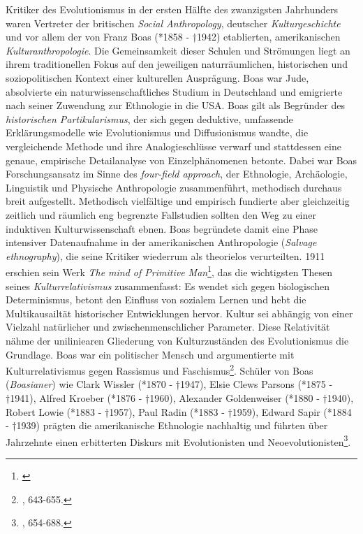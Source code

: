 \documentclass[openany,twoside,twocolumn]{book}
\let\rmarkdownfootnote\footnote%
\def\footnote{\protect\rmarkdownfootnote}
\begin{document}
Kritiker des Evolutionismus in der ersten Hälfte des zwanzigsten
Jahrhunders waren Vertreter der britischen \emph{Social Anthropology},
deutscher \emph{Kulturgeschichte} und vor allem der von Franz Boas
(*1858 - †1942) etablierten, amerikanischen \emph{Kulturanthropologie}.
Die Gemeinsamkeit dieser Schulen und Strömungen liegt an ihrem
traditionellen Fokus auf den jeweiligen naturräumlichen, historischen
und soziopolitischen Kontext einer kulturellen Ausprägung. Boas war
Jude, absolvierte ein naturwissenschaftliches Studium in Deutschland und
emigrierte nach seiner Zuwendung zur Ethnologie in die USA. Boas gilt
als Begründer des \emph{historischen Partikularismus}, der sich gegen
deduktive, umfassende Erklärungsmodelle wie Evolutionismus und
Diffusionismus wandte, die vergleichende Methode und ihre
Analogieschlüsse verwarf und stattdessen eine genaue, empirische
Detailanalyse von Einzelphänomenen betonte. Dabei war Boas
Forschungsansatz im Sinne des \emph{four-field approach}, der
Ethnologie, Archäologie, Linguistik und Physische Anthropologie
zusammenführt, methodisch durchaus breit aufgestellt. Methodisch
vielfältige und empirisch fundierte aber gleichzeitig zeitlich und
räumlich eng begrenzte Fallstudien sollten den Weg zu einer induktiven
Kulturwissenschaft ebnen. Boas begründete damit eine Phase intensiver
Datenaufnahme in der amerikanischen Anthropologie (\emph{Salvage
ethnography}), die seine Kritiker wiederrum als theorielos verurteilten.
1911 erschien sein Werk \emph{The mind of Primitive Man}\footnote{\textcite{Boasmindprimitiveman1911}},
das die wichtigsten Thesen seines \emph{Kulturrelativismus}
zusammenfasst: Es wendet sich gegen biologischen Determinismus, betont
den Einfluss von sozialem Lernen und hebt die Multikausailtät
historischer Entwicklungen hervor. Kultur sei abhängig von einer
Vielzahl natürlicher und zwischenmenschlicher Parameter. Diese
Relativität nähme der uniliniearen Gliederung von Kulturzuständen des
Evolutionismus die Grundlage. Boas war ein politischer Mensch und
argumentierte mit Kulturrelativismus gegen Rassismus und
Faschismus\footnote{\textcite{petermann_geschichte_2004}, 643-655.}.
Schüler von Boas (\emph{Boasianer}) wie Clark Wissler (*1870 - †1947),
Elsie Clews Parsons (*1875 - †1941), Alfred Kroeber (*1876 - †1960),
Alexander Goldenweiser (*1880 - †1940), Robert Lowie (*1883 - †1957),
Paul Radin (*1883 - †1959), Edward Sapir (*1884 - †1939) prägten die
amerikanische Ethnologie nachhaltig und führten über Jahrzehnte einen
erbitterten Diskurs mit Evolutionisten und Neoevolutionisten\footnote{\textcite{petermann_geschichte_2004},
  654-688.}.
\end{document}
